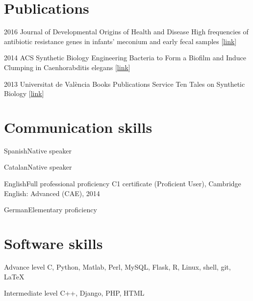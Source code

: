 \documentclass{tccv}
\begin{document}
\section{Publications}

\begin{yearlist}
	
\item{2016}
{Journal of Developmental Origins of Health and Disease}
{High frequencies of antibiotic resistance genes in infants' meconium and early
fecal samples [\href{http://journals.cambridge.org/action/displayAbstract;jsessionid=7AF02A6D7776F1D9397AB979BEBDC4C5.journals?aid=10076014&fileId=S2040174415001506}{link}]}

\item{2014}
{ACS Synthetic Biology}
{Engineering Bacteria to Form a Biofilm and Induce Clumping in Caenhorabditis elegans [\href{http://pubs.acs.org/doi/pdf/10.1021/sb4001883}{link}]}

\item{2013}
{Universitat de València \newline Books Publications Service}
{Ten Tales on Synthetic Biology [\href{http://2013.igem.org/Team:Valencia_Biocampus/Ten_Tales_On_Synthetic_Biology}{link}]}

\end{yearlist}

\section{Communication skills}

\begin{factlist}
	\item{Spanish}{Native speaker}
	\item{Catalan}{Native speaker}
	\item{English}{Full professional proficiency \newline C1 certificate (Proficient User), Cambridge English: Advanced (CAE), 2014 }
	\item{German}{Elementary proficiency}
\end{factlist}

\section{Software skills}

\begin{factlist}

\item{Advance level}
	 {C, Python, Matlab, Perl, MySQL, Flask,  R, Linux, shell, git, \LaTeX}

\item{Intermediate level}
     {C++, Django, PHP, HTML}

\end{factlist}
\end{document}
